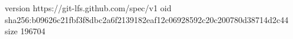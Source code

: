 version https://git-lfs.github.com/spec/v1
oid sha256:b09626c21fbf3f8dbc2a6f2139182eaf12c06928592c20c200780d38714d2c44
size 196704
